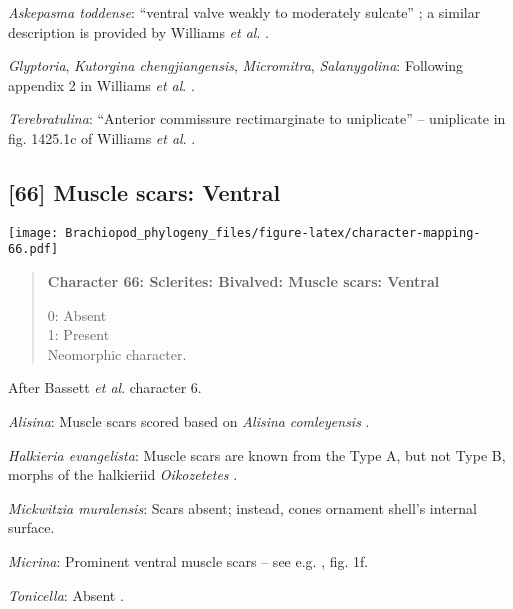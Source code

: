 \documentclass[openany]{book}
\theoremstyle{definition}
\theoremstyle{definition}
\theoremstyle{definition}
\theoremstyle{remark}
\begin{document}
\hypertarget{Askepasma_toddense-coding-65}{}
\emph{Askepasma toddense}: ``ventral valve weakly to moderately
sulcate'' \citep{Topper2013Theoldest}; a similar description is provided
by Williams \emph{et al}.
\citeyearpar{Williams2000LinguliformeaCraniiformea}.

\hypertarget{Glyptoria-coding-65}{}
\emph{Glyptoria}, \emph{Kutorgina chengjiangensis}, \emph{Micromitra},
\emph{Salanygolina}: Following appendix 2 in Williams \emph{et al}.
\citeyearpar{Williams1998Thediversity}.

\hypertarget{Terebratulina-coding-65}{}
\emph{Terebratulina}: ``Anterior commissure rectimarginate to
uniplicate'' -- uniplicate in fig. 1425.1c of Williams \emph{et al}.
\citeyearpar{Williams2006Rhynchonelliformeapart}.

\subsection*{{[}66{]} Muscle scars: Ventral}\label{muscle-scars-ventral}

\texttt{[image: Brachiopod\_phylogeny\_files/figure-latex/character-mapping-66.pdf]}

\begin{quote}
\textbf{Character 66: Sclerites: Bivalved: Muscle scars: Ventral }

0: Absent\\
1: Present\\
Neomorphic character.
\end{quote}

After Bassett \emph{et al}.
\citeyearpar{Bassett2001Functionalmorphology} character 6.

\hypertarget{Alisina-coding-66}{}
\emph{Alisina}: Muscle scars scored based on \emph{Alisina}
\emph{comleyensis} \citep{Bassett2001Functionalmorphology}.

\hypertarget{Halkieria_evangelista-coding-66}{}
\emph{Halkieria evangelista}: Muscle scars are known from the Type A,
but not Type B, morphs of the halkieriid \emph{Oikozetetes}
\citep{Paterson2009, Jacquet2014}.

\hypertarget{Mickwitzia_muralensis-coding-66}{}
\emph{Mickwitzia muralensis}: Scars absent; instead, cones ornament
shell's internal surface.

\hypertarget{Micrina-coding-66}{}
\emph{Micrina}: Prominent ventral muscle scars -- see e.g.
\citet{Holmer2008TheEarly}, fig. 1f.

\hypertarget{Tonicella-coding-66}{}
\emph{Tonicella}: Absent \citep{Schwabe2010}.
\end{document}
